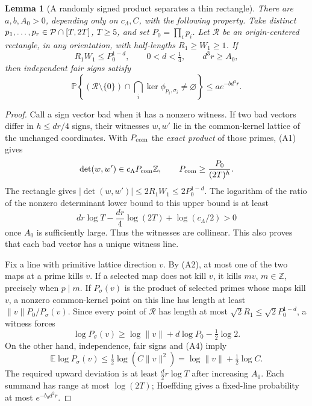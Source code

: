 \documentclass[11pt]{article}
\numberwithin{equation}{section}
\newtheorem{lemma}[theorem]{Lemma}
\theoremstyle{definition}\newtheorem{definition}[theorem]{Definition}
\theoremstyle{remark}\newtheorem{remark}[theorem]{Remark}
\newcommand{\Z}{\mathbb Z}\newcommand{\Q}{\mathbb Q}\newcommand{\R}{\mathbb R}
\newcommand{\E}{\mathbb E}\newcommand{\Prob}{\mathbb P}
\newcommand{\norm}[1]{\lVert #1\rVert}
\newcommand{\abs}[1]{\lvert #1\rvert}
\begin{document}
\begin{lemma}[A randomly signed product separates a thin rectangle]\label{lem:rectangle}
There are $a,b,A_0>0$, depending only on $c_\Lambda,C$, with the following property. Take distinct $p_1,\ldots,p_r\in\mathcal P\cap[T,2T]$, $T\ge5$, and set $P_0=\prod_i p_i$. Let $\mathcal R$ be an origin-centered rectangle, in any orientation, with half-lengths $R_1\ge W_1\ge1$. If
\[
 R_1W_1\le P_0^{1-d},\qquad 0<d<\tfrac14,\qquad d^3r\ge A_0,
\]
then independent fair signs satisfy
\[
 \Prob\left\{(\mathcal R\setminus\{0\})\cap
                 \bigcap_i\ker\phi_{p_i,\sigma_i}\ne\varnothing\right\}
 \le a e^{-bd^3r}.
\]
\end{lemma}
\begin{proof}
Call a sign vector bad when it has a nonzero witness. If two bad vectors differ in $h\le dr/4$ signs, their witnesses $w,w'$ lie in the common-kernel lattice of the unchanged coordinates. With $P_{\rm com}$ the \emph{exact product} of those primes, (A1) gives
\[
 \det(w,w')\in c_\Lambda P_{\rm com}\Z,
 \qquad P_{\rm com}\ge\frac{P_0}{(2T)^h}.
\]
The rectangle gives $\abs{\det(w,w')}\le2R_1W_1\le2P_0^{1-d}$. The logarithm of the ratio of the nonzero determinant lower bound to this upper bound is at least
\[
 dr\log T-\frac{dr}{4}\log(2T)+\log(c_\Lambda/2)>0
\]
once $A_0$ is sufficiently large. Thus the witnesses are collinear. This also proves that each bad vector has a unique witness line.

Fix a line with primitive lattice direction $v$. By (A2), at most one of the two maps at a prime kills $v$. If a selected map does not kill $v$, it kills $mv$, $m\in\Z$, precisely when $p\mid m$. If $P_\sigma(v)$ is the product of selected primes whose maps kill $v$, a nonzero common-kernel point on this line has length at least $\norm v P_0/P_\sigma(v)$. Since every point of $\mathcal R$ has length at most $\sqrt2R_1\le\sqrt2P_0^{1-d}$, a witness forces
\[
 \log P_\sigma(v)\ge\log\norm v+d\log P_0-\tfrac12\log2.
\]
On the other hand, independence, fair signs and (A4) imply
\[
 \E\log P_\sigma(v)\le\tfrac12\log(C\norm v^2)
                     =\log\norm v+\tfrac12\log C.
\]
The required upward deviation is at least $\frac d2r\log T$ after increasing $A_0$. Each summand has range at most $\log(2T)$; Hoeffding gives a fixed-line probability at most $e^{-b_0d^2r}$.


\end{proof}
\end{document}
